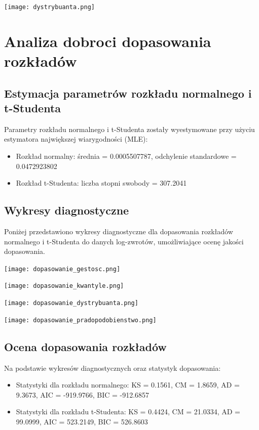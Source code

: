 \documentclass[a4paper,11pt]{article}
\begin{document}
\centerline{\texttt{[image: dystrybuanta.png]}} 

\section{Analiza dobroci dopasowania rozkładów}

\subsection{Estymacja parametrów rozkładu normalnego i t-Studenta}

Parametry rozkładu normalnego i t-Studenta zostały wyestymowane przy użyciu estymatora największej wiarygodności (MLE):
\begin{itemize}
    \item Rozkład normalny: średnia = 0.0005507787, odchylenie standardowe = 0.0472923802
    \item Rozkład t-Studenta: liczba stopni swobody = 307.2041
\end{itemize}

\subsection{Wykresy diagnostyczne}

Poniżej przedstawiono wykresy diagnostyczne dla dopasowania rozkładów normalnego i t-Studenta do danych log-zwrotów, umożliwiające ocenę jakości dopasowania.

\centerline{\texttt{[image: dopasowanie\_gestosc.png]}}
\centerline{\texttt{[image: dopasowanie\_kwantyle.png]}} 
\centerline{\texttt{[image: dopasowanie\_dystrybuanta.png]}}
\centerline{\texttt{[image: dopasowanie\_pradopodobienstwo.png]}} 

\subsection{Ocena dopasowania rozkładów}

Na podstawie wykresów diagnostycznych oraz statystyk dopasowania:
\begin{itemize}
    \item Statystyki dla rozkładu normalnego: KS = 0.1561, CM = 1.8659, AD = 9.3673, AIC = -919.9766, BIC = -912.6857
    \item Statystyki dla rozkładu t-Studenta: KS = 0.4424, CM = 21.0334, AD = 99.0999, AIC = 523.2149, BIC = 526.8603
\end{itemize}
\end{document}
